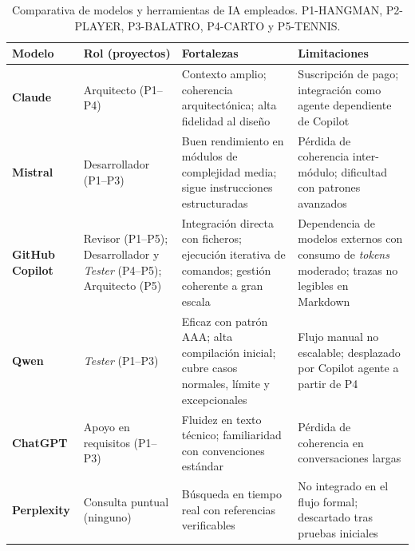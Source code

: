 \begin{table}[H]
\centering
\small
\renewcommand{\arraystretch}{1.3}
\begin{tabularx}{\textwidth}{|
>{\raggedright\arraybackslash}p{2cm}|
>{\raggedright\arraybackslash}p{3cm}|
Y|
Y|
}
\hline
\textbf{Modelo} & \textbf{Rol (proyectos)} & \textbf{Fortalezas} & \textbf{Limitaciones} \\
\hline
\textbf{Claude} &
Arquitecto (P1--P4) &
Contexto amplio; coherencia arquitectónica; alta fidelidad al diseño &
Suscripción de pago; integración como agente dependiente de Copilot \\
\hline
\textbf{Mistral} &
Desarrollador (P1--P3) &
Buen rendimiento en módulos de complejidad media; sigue instrucciones estructuradas &
Pérdida de coherencia inter-módulo; dificultad con patrones avanzados \\
\hline
\textbf{GitHub Copilot} &
Revisor (P1--P5); Desarrollador y \textit{Tester} (P4--P5); Arquitecto (P5) &
Integración directa con ficheros; ejecución iterativa de comandos; gestión coherente a gran escala &
Dependencia de modelos externos con consumo de \textit{tokens} moderado; trazas no legibles en Markdown \\
\hline
\textbf{Qwen} &
\textit{Tester} (P1--P3) &
Eficaz con patrón \ac{AAA}; alta compilación inicial; cubre casos normales, límite y excepcionales &
Flujo manual no escalable; desplazado por Copilot agente a partir de P4 \\
\hline
\textbf{ChatGPT} &
Apoyo en requisitos (P1--P3) &
Fluidez en texto técnico; familiaridad con convenciones estándar &
Pérdida de coherencia en conversaciones largas \\
\hline
\textbf{Perplexity} &
Consulta puntual (ninguno) &
Búsqueda en tiempo real con referencias verificables &
No integrado en el flujo formal; descartado tras pruebas iniciales \\
\hline
\end{tabularx}
\caption{Comparativa de modelos y herramientas de \ac{IA} empleados. P1-\ac{HANGMAN}, P2-\ac{PLAYER}, P3-\ac{BALATRO}, P4-\ac{CARTO} y P5-\ac{TENNIS}.}
\label{tab:comparativa-modelos}
\end{table}